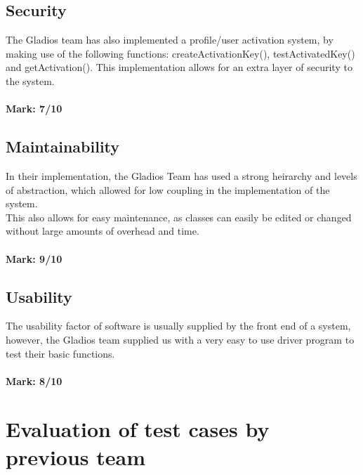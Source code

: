 \documentclass[12pt]{article}
\begin{document}
	\subsection{Security}
	
	The Gladios team has also implemented a profile/user activation system, by making use of the following functions: createActivationKey(), testActivatedKey() and getActivation().
	This implementation allows for an extra layer of security to the system. \\ \\ 
	\textbf{Mark: 7/10}
	
	\subsection{Maintainability}
	In their implementation, the Gladios Team has used a strong heirarchy and levels of abstraction, which allowed for low coupling in the implementation of the system. \\
	This also allows for easy maintenance, as classes can easily be edited or changed without large amounts of overhead and time. \\ \\ 
	\textbf{Mark: 9/10}
	
	\subsection{Usability}
	The usability factor of software is usually supplied by the front end of a system, however, the Gladios team supplied us with a very easy to use driver program to test their basic functions. \\ \\ 
	\textbf{Mark: 8/10}
	
\pagebreak
\section{Evaluation of test cases by previous team}
	
\end{document}
